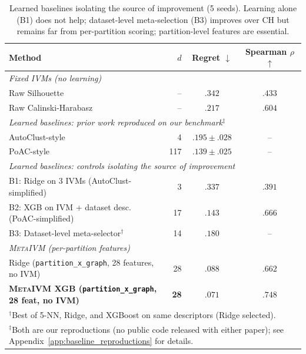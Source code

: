 \documentclass[10pt]{article} %
\newcommand{\ours}{\textsc{MetaIVM}}
\begin{document}
\begin{table}[t]
\centering
\caption{Learned baselines isolating the source of improvement (5 seeds). Learning alone (B1) does not help; dataset-level meta-selection (B3) improves over CH but remains far from per-partition scoring; partition-level features are essential.}
\label{tab:baselines}
\small
\begin{tabular}{lrcc}
\toprule
\textbf{Method} & $d$ & \textbf{Regret} $\downarrow$ & \textbf{Spearman} $\rho$ $\uparrow$ \\
\midrule
\multicolumn{4}{l}{\textit{Fixed IVMs (no learning)}} \\
Raw Silhouette & -- & $.342$ & $.433$ \\
Raw Calinski-Harabasz & -- & $.217$ & $.604$ \\
\midrule
\multicolumn{4}{l}{\textit{Learned baselines: prior work reproduced on our benchmark}$^\ddagger$} \\
AutoClust-style~\citep{poulakis2020autoclust} & 4 & $.195 \pm .028$ & -- \\
PoAC-style~\citep{dasilva2024poac} & 117 & $.139 \pm .025$ & -- \\
\midrule
\multicolumn{4}{l}{\textit{Learned baselines: controls isolating the source of improvement}} \\
B1: Ridge on 3 IVMs (AutoClust-simplified) & 3 & $.337$ & $.391$ \\
B2: XGB on IVM + dataset desc. (PoAC-simplified) & 17 & $.143$ & $.666$ \\
B3: Dataset-level meta-selector$^\dagger$ & 14 & $.180$ & -- \\
\midrule
\multicolumn{4}{l}{\textit{\ours{} (per-partition features)}} \\
Ridge (\texttt{partition\_x\_graph}, 28 features, no IVM) & 28 & $.088$ & $.662$ \\
\textbf{\ours{} XGB (\texttt{partition\_x\_graph}, 28 feat, no IVM)} & \textbf{28} & $\mathbf{.071}$ & $\mathbf{.748}$ \\
\bottomrule
\multicolumn{4}{l}{\footnotesize $^\dagger$Best of 5-NN, Ridge, and XGBoost on same descriptors (Ridge selected).} \\
\multicolumn{4}{l}{\footnotesize $^\ddagger$Both are our reproductions (no public code released with either paper); see Appendix~\ref{app:baseline_reproductions} for details.}
\end{tabular}
\end{table}
\end{document}
